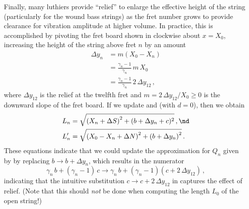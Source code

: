 Finally, many luthiers provide ``relief'' to enlarge the effective height of the string (particularly for the wound bass strings) as the fret number grows to provide clearance for vibration amplitude at higher volume. In practice, this is accomplished by pivoting the fret board shown in  clockwise about $x = X_0$, increasing the height of the string above fret $n$ by an amount
\begin{equation}
  \begin{split}
    \Delta y_n &= m \left(X_0 - X_n\right) \\
    &= \frac{\gamma_n - 1}{\gamma_n}\, m\, X_0 \\
    &= \frac{\gamma_n - 1}{\gamma_n}\, 2\, \Delta y_{12}\, ,
  \end{split}
\end{equation}
where $\Delta y_{12}$ is the relief at the twelfth fret and $m = 2\, \Delta y_{12} / X_0 \ge 0$ is the downward slope of the fret board. If we update  and  (with $d = 0$), then we obtain
\begin{subequations}
  \begin{align}
    L_n &= \sqrt{\left(X_n + \Delta S\right)^2 + (b + \Delta y_n + c)^2}\, , \nd \\
    L^\prime_n &= \sqrt{\left(X_0 - X_n + \Delta N\right)^2 + \left(b + \Delta y_n\right)^2}\, .
  \end{align}
\end{subequations}
These equations indicate that we could update the approximation for $Q_n$ given by  by replacing $b \longrightarrow b + \Delta y_n$, which results in the numerator
\begin{equation}
  \gamma_n\, b + (\gamma_n - 1)\, c \longrightarrow \gamma_n\, b + (\gamma_n - 1) \left(c + 2\, \Delta y_{12}\right)\, ,
\end{equation}
indicating that the intuitive substitution $c \longrightarrow c + 2\, \Delta y_{12}$ in  captures the effect of relief. (Note that this should \emph{not} be done when computing the length $L_0$ of the open string!)
